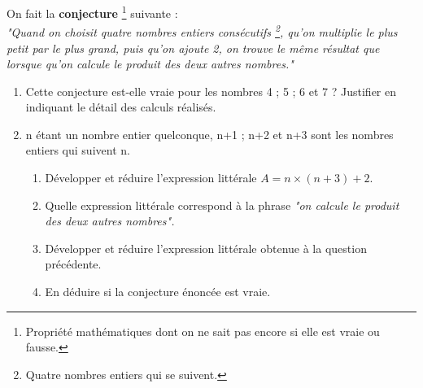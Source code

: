 \begin{minipage}{0.99\linewidth}

\exo


On fait la \textbf{conjecture} \footnote{Propriété mathématiques dont on ne sait pas encore si elle est vraie ou fausse.} suivante : \\

\textit{"Quand on choisit quatre nombres entiers consécutifs \footnote{ Quatre nombres entiers qui se suivent.}, qu'on multiplie le plus petit par le plus grand, puis qu'on ajoute 2, on trouve le même résultat que lorsque qu'on calcule le produit des deux autres nombres."}

\begin{enumerate}

\item Cette conjecture est-elle vraie pour les nombres 4 ; 5 ; 6 et 7 ? Justifier en indiquant le détail des calculs réalisés. 
\item n étant un nombre entier quelconque, n+1 ; n+2 et n+3 sont les nombres entiers qui suivent n.

\begin{enumerate}
\item Développer et réduire l'expression littérale $A = n \times(n+3) +2$.
\item Quelle expression littérale correspond à la phrase \textit{"on calcule le produit des deux autres nombres".}
\item Développer et réduire l'expression littérale obtenue à la question précédente. 
\item En déduire si la conjecture énoncée est vraie.

\end{enumerate} 

\end{enumerate}

\end{minipage}

\vspace{0.5cm}
